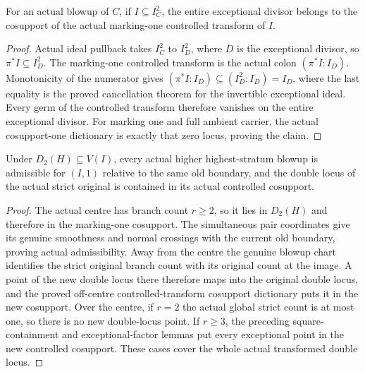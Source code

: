 \begin{lemma}
\label{hir:general-nc-square-centre-exceptional-controlled-cosupport}
\leanok
For an actual blowup of $C$, if $I\subseteq I_C^2$,
the entire exceptional divisor belongs to the cosupport of the actual
marking-one controlled transform of $I$.
\end{lemma}
\begin{proof}
Actual ideal pullback takes $I_C^2$ to $I_D^2$, where $D$ is the exceptional
divisor, so $\pi^*I\subseteq I_D^2$. The marking-one controlled transform
is the actual colon $(\pi^*I:I_D)$. Monotonicity of the numerator gives
$(\pi^*I:I_D)\subseteq(I_D^2:I_D)=I_D$, where the last equality is the
proved cancellation theorem for the invertible exceptional ideal. Every
germ of the controlled transform therefore vanishes on the entire
exceptional divisor. For marking one and full ambient carrier, the actual
cosupport-one dictionary is exactly that zero locus, proving the claim.
\end{proof}

\begin{theorem}
\label{hir:general-nc-double-locus-controlled-one-step}
\leanok
Under $D_2(H)\subseteq V(I)$, every actual higher highest-stratum blowup
is admissible for $(I,1)$ relative to the same old boundary, and the double
locus of the actual strict original is contained in its actual controlled
cosupport.
\end{theorem}
\begin{proof}
The actual centre has branch count $r\geq2$, so it lies in $D_2(H)$ and
therefore in the marking-one cosupport. The simultaneous pair coordinates
give its genuine smoothness and normal crossings with the current old
boundary, proving actual admissibility. Away from the centre the genuine
blowup chart identifies the strict original branch count with its original
count at the image. A point of the new double locus there therefore maps
into the original double locus, and the proved off-centre controlled-transform
cosupport dictionary puts it in the new cosupport. Over the centre, if
$r=2$ the actual global strict count is at most one, so there is no new
double-locus point. If $r\geq3$, the preceding square-containment and
exceptional-factor lemmas put every exceptional point in the new controlled
cosupport. These cases cover the whole actual transformed double locus.
\end{proof}

